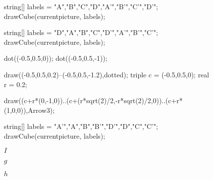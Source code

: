\documentclass[../gatm_answers.tex]{subfiles}
\begin{document}
\begin{figure}[h]
	\begin{center}
		\begin{minipage}[b]{0.3\textwidth}
			\centering
			\begin{asy}[width=0.9\textwidth]
				string[] labels = {"A","B","C","D","A'","B'","C'","D'"};
				drawCube(currentpicture, labels);
			\end{asy}
		\end{minipage}
		\hfill
		\begin{minipage}[b]{0.3\textwidth}
			\centering
			\begin{asy}[width=0.9\textwidth]
			string[] labels = {"D","A","B","C","D'","A'","B'","C'"};
			drawCube(currentpicture, labels);
			
			dot((-0.5,0.5,0));
			dot((-0.5,0.5,-1));
			
			draw((-0.5,0.5,0.2)--(-0.5,0.5,-1.2),dotted);
			triple c = (-0.5,0.5,0);
			real r = 0.2;
			
			draw((c+r*(0,-1,0))..(c+(r*sqrt(2)/2,-r*sqrt(2)/2,0))..(c+r*(1,0,0)),Arrow3);
			
			\end{asy}
		\end{minipage}
		\hfill
		\begin{minipage}[b]{0.3\textwidth}
			\centering
			\begin{asy}[width=0.9\textwidth]
				string[] labels = {"A'","A","B","B'","D'","D","C","C'"};
				drawCube(currentpicture, labels);
			\end{asy}
		\end{minipage}
	\end{center}
	\vspace*{-2\baselineskip}
	\begin{center}
		\begin{minipage}[t]{0.3\textwidth}
			\centering
			$I$
		\end{minipage}
		\hfill
		\begin{minipage}[t]{0.3\textwidth}
			\centering
			$g$
		\end{minipage}
		\hfill
		\begin{minipage}[t]{0.3\textwidth}
			\centering
			$h$
		\end{minipage}
	\end{center}
	\vspace*{-2\baselineskip}
	\begin{center}
		\begin{minipage}[t]{\textwidth}
			\label{fig:elements_g_and_h}
		\end{minipage}
	\end{center}
	\vspace*{-2\baselineskip}
\end{figure}
\end{document}
